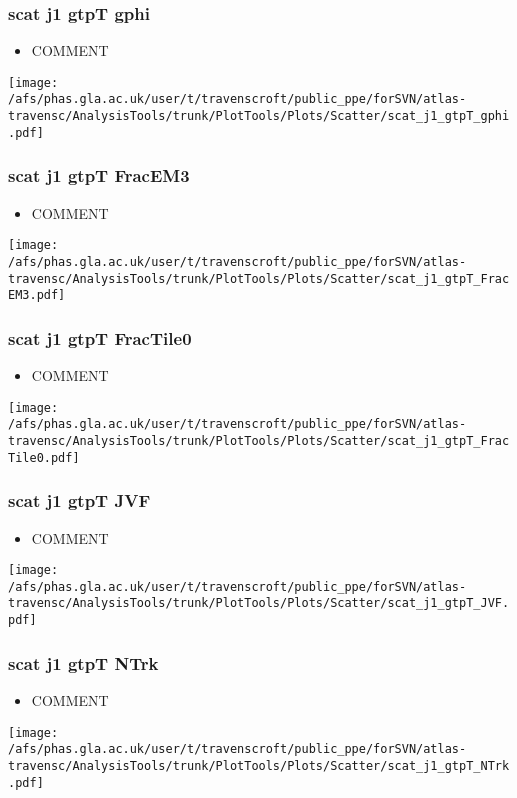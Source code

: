 \documentclass{beamer}
\begin{document}
\begin{frame}
\frametitle{scat j1 gtpT gphi}
\begin{itemize}
\item COMMENT
\end{itemize}
\begin{center}
\texttt{[image: /afs/phas.gla.ac.uk/user/t/travenscroft/public\_ppe/forSVN/atlas-travensc/AnalysisTools/trunk/PlotTools/Plots/Scatter/scat\_j1\_gtpT\_gphi.pdf]}
\end{center}
\end{frame}

\begin{frame}
\frametitle{scat j1 gtpT FracEM3}
\begin{itemize}
\item COMMENT
\end{itemize}
\begin{center}
\texttt{[image: /afs/phas.gla.ac.uk/user/t/travenscroft/public\_ppe/forSVN/atlas-travensc/AnalysisTools/trunk/PlotTools/Plots/Scatter/scat\_j1\_gtpT\_FracEM3.pdf]}
\end{center}
\end{frame}

\begin{frame}
\frametitle{scat j1 gtpT FracTile0}
\begin{itemize}
\item COMMENT
\end{itemize}
\begin{center}
\texttt{[image: /afs/phas.gla.ac.uk/user/t/travenscroft/public\_ppe/forSVN/atlas-travensc/AnalysisTools/trunk/PlotTools/Plots/Scatter/scat\_j1\_gtpT\_FracTile0.pdf]}
\end{center}
\end{frame}

\begin{frame}
\frametitle{scat j1 gtpT JVF}
\begin{itemize}
\item COMMENT
\end{itemize}
\begin{center}
\texttt{[image: /afs/phas.gla.ac.uk/user/t/travenscroft/public\_ppe/forSVN/atlas-travensc/AnalysisTools/trunk/PlotTools/Plots/Scatter/scat\_j1\_gtpT\_JVF.pdf]}
\end{center}
\end{frame}

\begin{frame}
\frametitle{scat j1 gtpT NTrk}
\begin{itemize}
\item COMMENT
\end{itemize}
\begin{center}
\texttt{[image: /afs/phas.gla.ac.uk/user/t/travenscroft/public\_ppe/forSVN/atlas-travensc/AnalysisTools/trunk/PlotTools/Plots/Scatter/scat\_j1\_gtpT\_NTrk.pdf]}
\end{center}
\end{frame}
\end{document}
